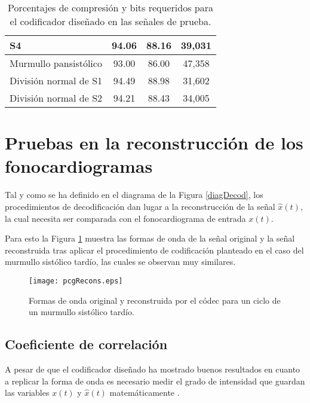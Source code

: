 \begin{table}[h]
\begin{tabular}{l|c|c|c}
S4                                                        & 94.06        & 88.16                             & 39,031                                                                                                             \\ \hline
Murmullo pansistólico                                     & 93.00        & 86.00                             & 47,358                                                                                                             \\ \hline
División normal de S1                                     & 94.49        & 88.98                             & 31,602                                                                                                             \\ \hline
División normal de S2                                     & 94.21        & 88.43                             & 34,005                                                                                                            
\end{tabular}
	\caption{Porcentajes de compresión y bits requeridos para el codificador diseñado en las señales de prueba.}
	\label{comRat}
\end{table}

\section{Pruebas en la reconstrucción de los fonocardiogramas}
Tal y como se ha definido en el diagrama de la Figura \ref{diagDecod}, los procedimientos de decodificación dan lugar a la reconstrucción de la señal $\hat{x}(t)$, la cual necesita ser comparada con el fonocardiograma de entrada $x(t)$. 

Para esto la Figura \ref{pcgRecons} muestra las formas de onda de la señal original y la señal reconstruida tras aplicar el procedimiento de codificación planteado en el caso del murmullo sistólico tardío, las cuales se observan muy similares.
\begin{figure}[ht]
  \centering
  \texttt{[image: pcgRecons.eps]}
  \caption{Formas de onda original y reconstruida por el códec para un ciclo de un murmullo sistólico tardío.}
  \label{pcgRecons}
\end{figure}
\subsection{Coeficiente de correlación}
A pesar de que el codificador diseñado ha mostrado buenos resultados en cuanto a replicar la forma de onda es necesario medir el grado de intensidad que guardan las variables $x(t)$ y $\hat{x}(t)$ matemáticamente \cite[]{Senhadji1995}. 

